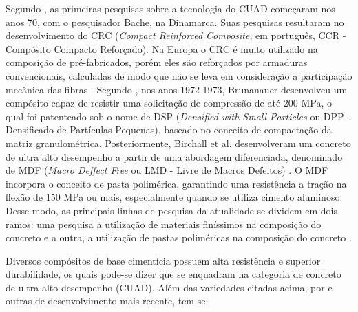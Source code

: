 Segundo , as primeiras pesquisas sobre a tecnologia do CUAD começaram nos anos 70, com o pesquisador Bache, na Dinamarca. Suas pesquisas resultaram no desenvolvimento do CRC (\textit{Compact Reinforced Composite}, em português, CCR - Compósito Compacto Reforçado). Na Europa o CRC é muito utilizado na composição de pré-fabricados, porém eles são reforçados por armaduras convencionais, calculadas de modo que não se leva em consideração a participação mecânica das fibras \cite[p.~6]{Resplendino}. Segundo , nos anos 1972-1973, Brunanauer desenvolveu um compósito capaz de resistir uma solicitação de compressão de até 200 MPa, o qual foi patenteado sob o nome de DSP (\textit{Densified with Small Particles} ou DPP - Densificado de Partículas Pequenas), baseado no conceito de compactação da matriz granulométrica. Posteriormente, Birchall et al. desenvolveram um concreto de ultra alto desempenho a partir de uma abordagem diferenciada, denominado de MDF (\textit{Macro Deffect Free} ou LMD - Livre de Macros Defeitos) . O MDF incorpora o conceito de pasta polimérica, garantindo uma resistência a tração na flexão de 150 MPa ou mais, especialmente quando se utiliza cimento aluminoso. Desse modo, as principais linhas de pesquisa da atualidade se dividem em dois ramos: uma pesquisa a utilização de materiais finíssimos na composição do concreto e a outra, a utilização de pastas poliméricas na composição do concreto \cite[p.~8]{Vanderlei}.


Diversos compósitos de base cimentícia possuem alta resistência e superior durabilidade, os quais pode-se dizer que se enquadram na categoria de concreto de ultra alto desempenho (CUAD). Além das variedades citadas acima, por  e outras de desenvolvimento mais recente, tem-se:

